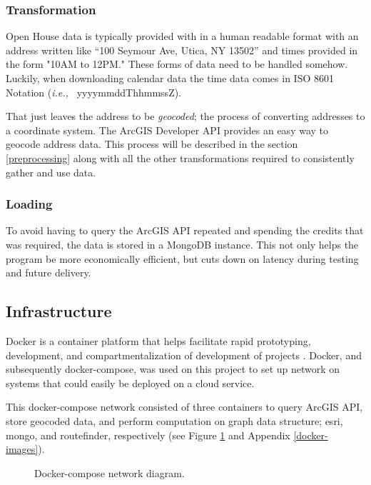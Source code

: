 \documentclass[letterpaper,11pt]{report}
\theoremstyle{definition}
\theoremstyle{definition}
\def\ie{{i.e.,}\ }
\begin{document}
\subsubsection{Transformation}\label{T}
Open House data is typically provided with in a human readable format with an address written like ``100 Seymour Ave, Utica, NY 13502'' and times provided in the form "10AM to 12PM." These forms of data need to be handled somehow. Luckily, when downloading calendar data the time data comes in ISO 8601 Notation (\emph{\ie} yyyymmddThhmmssZ).

That just leaves the address to be \emph{geocoded}; the process of converting addresses to a coordinate system. The ArcGIS Developer API provides an easy way to geocode address data. This process will be described in the section \ref{preprocessing} along with all the other transformations required to consistently gather and use data.
 
\subsubsection{Loading}\label{L}
To avoid having to query the ArcGIS API repeated and spending the credits that was required\cite{ArcGIS}, the data is stored in a MongoDB instance. This not only helps the program be more economically efficient, but cuts down on latency during testing and future delivery.

\subsection{Infrastructure}
Docker is a container platform that helps facilitate rapid prototyping, development, and compartmentalization of development of projects \cite{DOCKER}. Docker, and subsequently docker-compose\cite{DC}, was used on this project to set up network on systems that could easily be deployed on a cloud service. 

This docker-compose network consisted of three containers to query ArcGIS API, store geocoded data, and perform computation on graph data structure; esri, mongo, and routefinder, respectively (see Figure \ref{docker-compose-network-diagram} and Appendix \ref{docker-images}).
\begin{figure}[!htb]
  \begin{center}
      
      \caption{Docker-compose network diagram.}\label{docker-compose-network-diagram}
    \end{center}
\end{figure}
\end{document}
